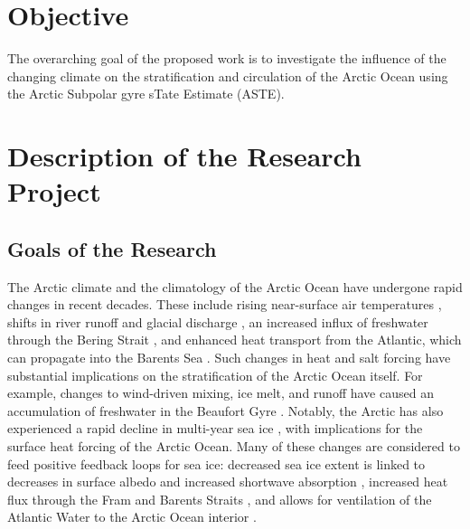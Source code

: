 \documentclass[a4paper,12pt]{article}
\begin{document}
	\newpage
	{\setlength\parskip{\fill}
		\tableofcontents
	}

	\newpage

        \section*{Objective}
        The overarching goal of the proposed work is to investigate the influence of the changing climate on the stratification and circulation of the Arctic Ocean using the Arctic Subpolar gyre sTate Estimate (ASTE).
	
		
	\section{Description of the Research Project}
 
	\subsection{Goals of the Research}
        The Arctic climate and the climatology of the Arctic Ocean have undergone rapid changes in recent decades. These include rising near-surface air temperatures \cite{Screen2010}, shifts in river runoff and glacial discharge \cite{Proshutinsky2020,Nummelin2015}, an increased influx of freshwater through the Bering Strait \cite{Woodgate2018,Woodgate2021}, and enhanced heat transport from the Atlantic, which can propagate into the Barents Sea \cite{Hakkinen2009}. Such changes in heat and salt forcing have substantial implications on the stratification of the Arctic Ocean itself. For example, changes to wind-driven mixing, ice melt, and runoff have caused an accumulation of freshwater in the Beaufort Gyre \cite{Proshutinsky2002,Proshutinsky2020,Giles2012}. Notably, the Arctic has also experienced a rapid decline in multi-year sea ice \cite{Perovich2009}, with implications for the surface heat forcing of the Arctic Ocean. Many of these changes are considered to feed positive feedback loops for sea ice: decreased sea ice extent is linked to decreases in surface albedo and increased shortwave absorption \cite{Timmermans2018,Pistone2019}, increased heat flux through the Fram and Barents Straits \cite{Lind2018,Wang2020}, and allows for ventilation of the Atlantic Water to the Arctic Ocean interior \cite{Polyakov2017}.
\end{document}
